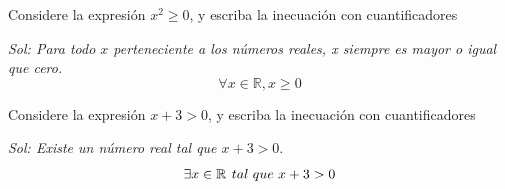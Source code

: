 \begin{myexample}
Considere la expresión $x^{2}\geq 0$, y escriba la inecuación con cuantificadores
\end{myexample}

\textit{Sol: Para todo $x$ perteneciente a los números reales, x siempre es mayor o igual que cero. }
\begin{equation*}
\forall x \in \mathbb{R}, x\geq 0
\end{equation*}

\begin{myexample}
Considere la expresión $x +3 > 0$, y escriba la inecuación con cuantificadores
\end{myexample}

\textit{Sol: Existe un número real tal que $x+3>0$}.
\begin{equation*}
\exists x \in \mathbb{R}\hspace{4px} tal \hspace{3px} que \hspace{3px} x+3>0
\end{equation*}

%
%

